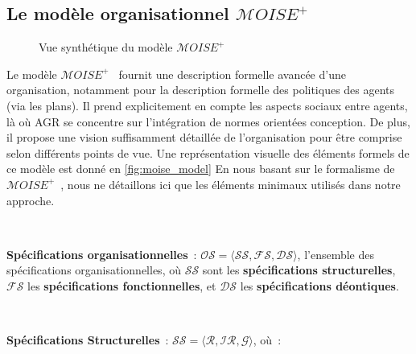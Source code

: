 \documentclass[francais,ROIA,Unicode,manuscript]{cedram}
\begin{document}
\subsection{Le modèle organisationnel $\mathcal{M}OISE^+$}

\begin{figure}[h!]
    \centering
    
    \caption{Vue synthétique du modèle $\mathcal{M}OISE^+$}
    \label{fig:moise_model}
\end{figure}

Le modèle $\mathcal{M}OISE^+$~\cite{Hubner2007} fournit une description formelle avancée d'une organisation, notamment pour la description formelle des politiques des agents (via les plans). Il prend explicitement en compte les aspects sociaux entre agents, là où AGR se concentre sur l'intégration de normes orientées conception. De plus, il propose une vision suffisamment détaillée de l'organisation pour être comprise selon différents points de vue. Une représentation visuelle des éléments formels de ce modèle est donné en \autoref{fig:moise_model}
En nous basant sur le formalisme de $\mathcal{M}OISE^+$~\cite{Hubner2007}, nous ne détaillons ici que les éléments minimaux utilisés dans notre approche.

\

\noindent \textbf{Spécifications organisationnelles}~: \quad $\mathcal{OS} = \langle \mathcal{SS}, \mathcal{FS}, \mathcal{DS} \rangle$, l'ensemble des spécifications organisationnelles, où $\mathcal{SS}$ sont les \textbf{spécifications structurelles}, $\mathcal{FS}$ les \textbf{spécifications fonctionnelles}, et $\mathcal{DS}$ les \textbf{spécifications déontiques}.

\

\noindent \textbf{Spécifications Structurelles}~: \quad $\mathcal{SS} = \langle \mathcal{R}, \mathcal{IR}, \mathcal{G} \rangle$, où~:
\end{document}
